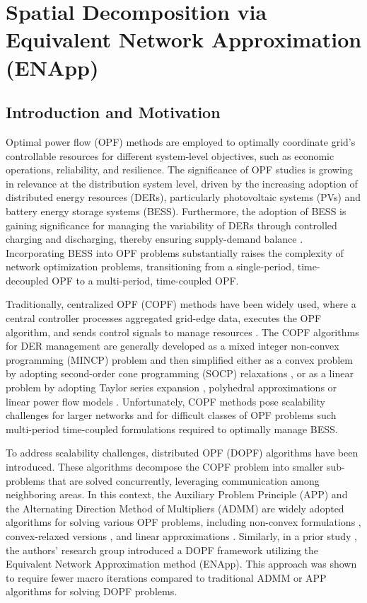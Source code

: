 \clearpage
\section{Spatial Decomposition via Equivalent Network Approximation (ENApp)}
\label{sec:enapp}
\subsection{Introduction and Motivation}

Optimal power flow (OPF) methods are employed to optimally coordinate grid's controllable resources for different system-level objectives, such as economic operations, reliability, and resilience. The significance of OPF studies is growing in relevance at the distribution system level, driven by the increasing adoption of distributed energy resources (DERs), particularly photovoltaic systems (PVs) and battery energy storage systems (BESS). Furthermore, the adoption of BESS is gaining significance for managing the variability of DERs through controlled charging and discharging, thereby ensuring supply-demand balance \cite{tgangwar}. Incorporating BESS into OPF problems substantially raises the complexity of network optimization problems, transitioning from a single-period, time-decoupled OPF to a multi-period, time-coupled OPF.

Traditionally, centralized OPF (COPF) methods have been widely used, where a central controller processes aggregated grid-edge data, executes the OPF algorithm, and sends control signals to manage resources \cite{spaul}. The COPF algorithms for DER management are generally developed as a mixed integer non-convex programming (MINCP) problem and then simplified either as a convex problem by adopting second-order cone programming (SOCP) relaxations \cite{Wei} \cite{Chowdhury}, or as a linear problem by adopting Taylor series expansion \cite{spaul}, polyhedral approximations \cite{Guo} or linear power flow models \cite{Yuan}. Unfortunately, COPF methods pose scalability challenges for larger networks and for difficult classes of OPF problems such multi-period time-coupled formulations required to optimally manage BESS. 

To address scalability challenges, distributed OPF (DOPF) algorithms have been introduced. These algorithms decompose the COPF problem into smaller sub-problems that are solved concurrently, leveraging communication among neighboring areas. In this context, the Auxiliary Problem Principle (APP) and the Alternating Direction Method of Multipliers (ADMM) are widely adopted algorithms for solving various OPF problems, including non-convex formulations \cite{Fazio}, convex-relaxed versions \cite{Zheng, Wang, Biswas}, and linear approximations \cite{Paul2}. Similarly, in a prior study \cite{Sadnan}, the authors' research group introduced a DOPF framework utilizing the Equivalent Network Approximation method (ENApp). This approach was shown to require fewer macro iterations compared to traditional ADMM or APP algorithms for solving DOPF problems.

